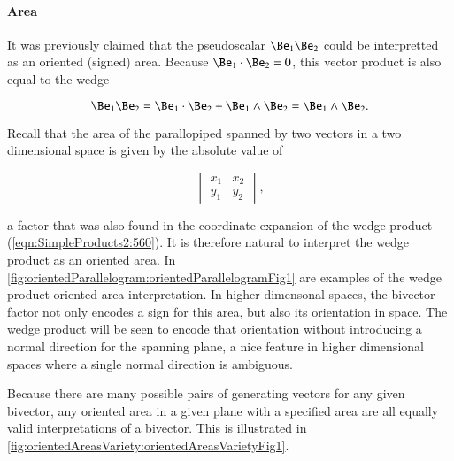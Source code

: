 \paragraph{Area}

It was previously claimed that the pseudoscalar \( \Be_1 \Be_2 \) could be interpretted as an oriented (signed) area.  Because \( \Be_1 \cdot \Be_2 = 0 \), this vector product is also equal to the wedge

\begin{dmath}\label{eqn:SimpleProducts2:640}
\Be_1 \Be_2 = \Be_1 \cdot \Be_2 +
\Be_1 \wedge \Be_2
=
\Be_1 \wedge \Be_2.
\end{dmath}

Recall that the area of the parallopiped spanned by two vectors in a two dimensional space is given by the absolute value of

\begin{dmath}\label{eqn:SimpleProducts2:660}
\begin{vmatrix}
   x_1 & x_2 \\
   y_1 & y_2
\end{vmatrix},
\end{dmath}

a factor that was also found in the coordinate expansion of the wedge product (\cref{eqn:SimpleProducts2:560}).  It is therefore natural to interpret the wedge product as an oriented area.  In \cref{fig:orientedParallelogram:orientedParallelogramFig1} are examples of the wedge product oriented area interpretation.
In higher dimensonal spaces, the bivector factor not only encodes a sign for this area, but also its orientation in space.  The wedge product will be seen to encode that orientation without introducing a normal direction for the spanning plane, a nice feature in higher dimensional spaces where a single normal direction is ambiguous.

Because there are many possible pairs of generating vectors for any given bivector, any oriented area in a given plane with a specified area are all equally valid interpretations of a bivector.  This is illustrated in \cref{fig:orientedAreasVariety:orientedAreasVarietyFig1}.

